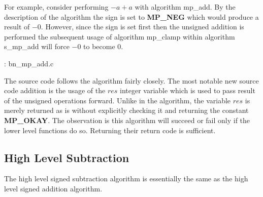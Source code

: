 \documentclass[b5paper]{book}
\begin{document}
For example, consider performing $-a + a$ with algorithm mp\_add.  By the description of the algorithm the sign is set to \textbf{MP\_NEG} which would
produce a result of $-0$.  However, since the sign is set first then the unsigned addition is performed the subsequent usage of algorithm mp\_clamp 
within algorithm s\_mp\_add will force $-0$ to become $0$.  

\vspace{+3mm}\begin{small}
\hspace{-5.1mm}{\bf File}: bn\_mp\_add.c
\vspace{-3mm}
\begin{alltt}
\end{alltt}
\end{small}

The source code follows the algorithm fairly closely.  The most notable new source code addition is the usage of the $res$ integer variable which
is used to pass result of the unsigned operations forward.  Unlike in the algorithm, the variable $res$ is merely returned as is without
explicitly checking it and returning the constant \textbf{MP\_OKAY}.  The observation is this algorithm will succeed or fail only if the lower
level functions do so.  Returning their return code is sufficient.

\subsection{High Level Subtraction}
The high level signed subtraction algorithm is essentially the same as the high level signed addition algorithm.  
\end{document}
